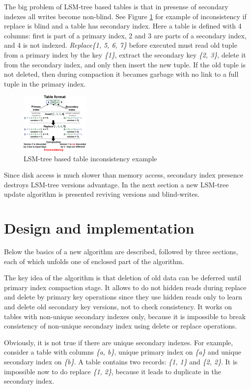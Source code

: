 \documentclass{vldb}
\begin{document}
The big problem of LSM-tree based tables is that in presense of secondary
indexes all writes become non-blind. See Figure \ref{fig:inconsistent_example}
for example of inconsistency if replace is blind and a table has secondary
index. Here a table is defined with 4 columns: first is part of a primary index,
2 and 3 are parts of a secondary index, and 4 is not indexed.
\textit{Replace\{1, 5, 6, 7\}} before executed must read old tuple from a
primary index by the key \textit{\{1\}}, extract the secondary key
\textit{\{2, 3\}}, delete it from the secondary index, and only then insert the
new tuple. If the old tuple is not deleted, then during compaction it becames
garbage with no link to a full tuple in the primary index.
\begin{figure}
\centering
\includegraphics[width=0.3\textwidth]{inconsistent_example}
\caption{LSM-tree based table inconsistency example}
\label{fig:inconsistent_example}
\end{figure}

Since disk access is much slower than memory access, secondary index presence
destroys LSM-tree versions advantage. In the next section a new LSM-tree update
algorithm is presented reviving versions and blind-writes.

\section{Design and implementation}
Below the basics of a new algorithm are described, followed by three sections,
each of which unfolds one of enclosed part of the algorithm.

The key idea of the algorithm is that deletion of old data can be deferred until
primary index compaction stage. It allows to do not hidden reads during replace
and delete by primary key operations since they use hidden reads only to learn
and delete old secondary key versions, not to check consistency. It works on
tables with non-unique secondary indexes only, because it is impossible to break
consistency of non-unique secondary index using delete or replace operations.

Obviously, it is not true if there are unique secondary indexes. For example,
consider a table with columns \textit{\{a, b\}}, unique primary index on
\textit{\{a\}} and unique secondary index on \textit{\{b\}}. A table contains
two records: \textit{\{1, 1\}} and \textit{\{2, 2\}}. It is impossible now to do
replace \textit{\{1, 2\}}, because it leads to duplicate in the secondary index.
\end{document}
